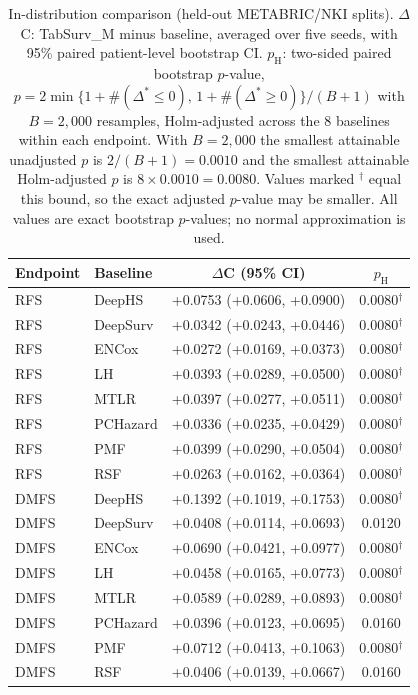 \begin{table}[t]
\centering
\caption{In-distribution comparison (held-out METABRIC/NKI splits). $\Delta$C: TabSurv\_M minus baseline, averaged over five seeds, with 95\% paired patient-level bootstrap CI. $p_{\mathrm{H}}$: two-sided paired bootstrap $p$-value, $p = 2\min\{1+\#(\Delta^{*}\le 0),\,1+\#(\Delta^{*}\ge 0)\}/(B+1)$ with $B=2{,}000$ resamples, Holm-adjusted across the 8 baselines within each endpoint. With $B=2{,}000$ the smallest attainable unadjusted $p$ is $2/(B+1)=0.0010$ and the smallest attainable Holm-adjusted $p$ is $8\times0.0010=0.0080$. Values marked $^{\dagger}$ equal this bound, so the exact adjusted $p$-value may be smaller. All values are exact bootstrap $p$-values; no normal approximation is used.}
\label{tab:ind_effect_sizes}
\footnotesize
\begin{tabular}{llcc}
\toprule
Endpoint & Baseline & $\Delta$C (95\% CI) & $p_{\mathrm{H}}$ \\
\midrule
RFS & DeepHS & +0.0753 (+0.0606, +0.0900) & 0.0080$^{\dagger}$ \\
RFS & DeepSurv & +0.0342 (+0.0243, +0.0446) & 0.0080$^{\dagger}$ \\
RFS & ENCox & +0.0272 (+0.0169, +0.0373) & 0.0080$^{\dagger}$ \\
RFS & LH & +0.0393 (+0.0289, +0.0500) & 0.0080$^{\dagger}$ \\
RFS & MTLR & +0.0397 (+0.0277, +0.0511) & 0.0080$^{\dagger}$ \\
RFS & PCHazard & +0.0336 (+0.0235, +0.0429) & 0.0080$^{\dagger}$ \\
RFS & PMF & +0.0399 (+0.0290, +0.0504) & 0.0080$^{\dagger}$ \\
RFS & RSF & +0.0263 (+0.0162, +0.0364) & 0.0080$^{\dagger}$ \\
DMFS & DeepHS & +0.1392 (+0.1019, +0.1753) & 0.0080$^{\dagger}$ \\
DMFS & DeepSurv & +0.0408 (+0.0114, +0.0693) & 0.0120 \\
DMFS & ENCox & +0.0690 (+0.0421, +0.0977) & 0.0080$^{\dagger}$ \\
DMFS & LH & +0.0458 (+0.0165, +0.0773) & 0.0080$^{\dagger}$ \\
DMFS & MTLR & +0.0589 (+0.0289, +0.0893) & 0.0080$^{\dagger}$ \\
DMFS & PCHazard & +0.0396 (+0.0123, +0.0695) & 0.0160 \\
DMFS & PMF & +0.0712 (+0.0413, +0.1063) & 0.0080$^{\dagger}$ \\
DMFS & RSF & +0.0406 (+0.0139, +0.0667) & 0.0160 \\
\bottomrule
\end{tabular}
\end{table}
